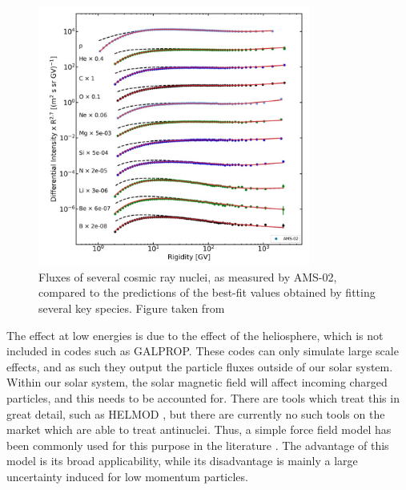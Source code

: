 \begin{figure}[hbtp]
    \centering
    \includegraphics[width=0.8\textwidth]{figures/Boscini_Fits.png}
    \caption{Fluxes of several cosmic ray nuclei, as measured by AMS-02, compared to the predictions of the best-fit values obtained by fitting several key species. Figure taken from \cite{Boschini:2018baj}}
    \label{fig:BosciniFits}
\end{figure}

The effect at low energies is due to the effect of the heliosphere, which is not included in codes such as GALPROP. These codes can only simulate large scale effects, and as such they output the particle fluxes outside of our solar system. Within our solar system, the solar magnetic field will affect incoming charged particles, and this needs to be accounted for. There are tools which treat this in great detail, such as HELMOD \cite{}, but there are currently no such tools on the market which are able to treat antinuclei. Thus, a simple force field model has been commonly used for this purpose in the literature \cite{}. The advantage of this model is its broad applicability, while its disadvantage is mainly a large uncertainty induced for low momentum particles\cite{}. \\

